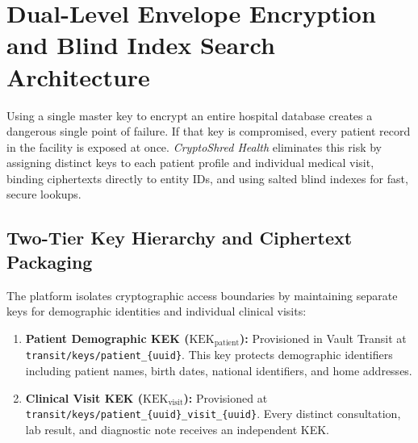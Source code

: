 
\section{Dual-Level Envelope Encryption and Blind Index Search Architecture}\label{section:encryption-indexing}

Using a single master key to encrypt an entire hospital database creates a dangerous single point of failure. If that key is compromised, every patient record in the facility is exposed at once. \textit{CryptoShred Health} eliminates this risk by assigning distinct keys to each patient profile and individual medical visit, binding ciphertexts directly to entity IDs, and using salted blind indexes for fast, secure lookups.

\subsection{Two-Tier Key Hierarchy and Ciphertext Packaging}

The platform isolates cryptographic access boundaries by maintaining separate keys for demographic identities and individual clinical visits:
\begin{enumerate}
    \item \textbf{Patient Demographic KEK ($\text{KEK}_{\text{patient}}$):} Provisioned in Vault Transit at \texttt{transit/keys/patient\_\{uuid\}}. This key protects demographic identifiers including patient names, birth dates, national identifiers, and home addresses.

    \item \textbf{Clinical Visit KEK ($\text{KEK}_{\text{visit}}$):} Provisioned at \texttt{transit/keys/patient\_\{uuid\}\_visit\_\{uuid\}}. Every distinct consultation, lab result, and diagnostic note receives an independent KEK.
\end{enumerate}

